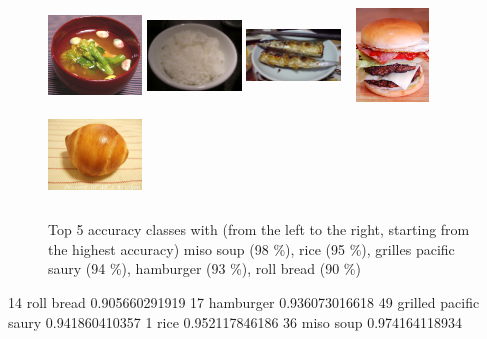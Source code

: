 \begin{figure}
    \centering
    \includegraphics[height=2.5cm, width=2.5cm]{img/top_miso_soup.jpg}
    \includegraphics[height=2.5cm, width=2.5cm]{img/top_rice.jpg}
    \includegraphics[height=2.5cm, width=2.5cm]{img/top_grilled_pacific_saury.jpg}
    \includegraphics[height=2.5cm, width=2.5cm]{img/top_hamburger.jpg}
    \includegraphics[height=2.5cm, width=2.5cm]{img/top_roll_bread.jpg}
    \caption[Top 5 accuracy classes]{Top 5 accuracy classes with (from the left to the right, starting from the highest accuracy) miso soup (98 \%), rice (95 \%), grilles pacific saury (94 \%), hamburger (93 \%), roll bread (90 \%)}
    \label{fig:top_5}
\end{figure}

14 roll bread 0.905660291919
17 hamburger 0.936073016618
49 grilled pacific saury 0.941860410357
1 rice 0.952117846186
36 miso soup 0.974164118934

